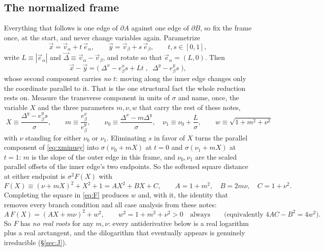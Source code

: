 \documentclass[11pt]{article}
\numberwithin{equation}{section}
\newcommand{\vv}[1]{\vec{#1}}
\begin{document}
\subsection{The normalized frame}
Everything that follows is one edge of $\partial A$ against one edge of $\partial B$, so fix the frame
once, at the start, and never change variables again. Parametrize
\[
  \vv x=\vv v_\alpha+t\,\vv e_\alpha,\qquad \vv y=\vv v_\beta+s\,\vv e_\beta,
  \qquad t,s\in[0,1],
\]
write $L\equiv|\vv e_\alpha|$ and $\vv\Delta\equiv\vv v_\alpha-\vv v_\beta$, and rotate so that
$\vv e_\alpha=(L,0)$. Then
\begin{equation}\label{eq:xminusy}
  \vv x-\vv y=\big(\;\Delta^x-e_\beta^x s+Lt\;,\;\;\Delta^y-e_\beta^y s\;\big),
\end{equation}
whose second component carries \emph{no} $t$: moving along the inner edge changes only the coordinate
parallel to it. That is the one structural fact the whole reduction rests on. Measure the transverse
component in units of $\sigma$ and name, once, the variable $X$ and the three parameters $m,\nu,w$ that
carry the rest of these notes,
\begin{equation}\label{eq:Xsub}
  \boxed{\;X\equiv\frac{\Delta^y-e_\beta^y s}{\sigma},\qquad
  m\equiv\frac{e_\beta^x}{e_\beta^y},\qquad
  \nu_0\equiv\frac{\Delta^x-m\Delta^y}{\sigma},\quad \nu_1\equiv\nu_0+\frac L\sigma,\qquad
  w\equiv\sqrt{1+m^2+\nu^2}\;}
\end{equation}
with $\nu$ standing for either $\nu_0$ or $\nu_1$. Eliminating $s$ in favor of $X$ turns the parallel
component of \eqref{eq:xminusy} into $\sigma(\nu_0+mX)$ at $t=0$ and $\sigma(\nu_1+mX)$ at $t=1$: $m$ is
the slope of the outer edge in this frame, and $\nu_0,\nu_1$ are the scaled parallel offsets of the
inner edge's two endpoints. So the softened square distance at either endpoint is $\sigma^2F(X)$ with
\begin{equation}\label{eq:F}
  F(X)\equiv(\nu+mX)^2+X^2+1=AX^2+BX+C,\qquad A=1+m^2,\quad B=2m\nu,\quad C=1+\nu^2 .
\end{equation}
Completing the square in \eqref{eq:F} produces $w$ and, with it, the identity that removes every branch
condition and all case analysis from these notes:
\begin{equation}\label{eq:disc}
  A\,F(X)=(AX+m\nu)^2+w^2,\qquad w^2=1+m^2+\nu^2>0\quad\text{always}
  \qquad\big(\text{equivalently }4AC-B^2=4w^2\big).
\end{equation}
So $F$ has \emph{no real roots} for any $m,\nu$: every antiderivative below is a real logarithm plus a
real arctangent, and the dilogarithm that eventually appears is genuinely irreducible (\S\ref{sec:J}).
\end{document}
